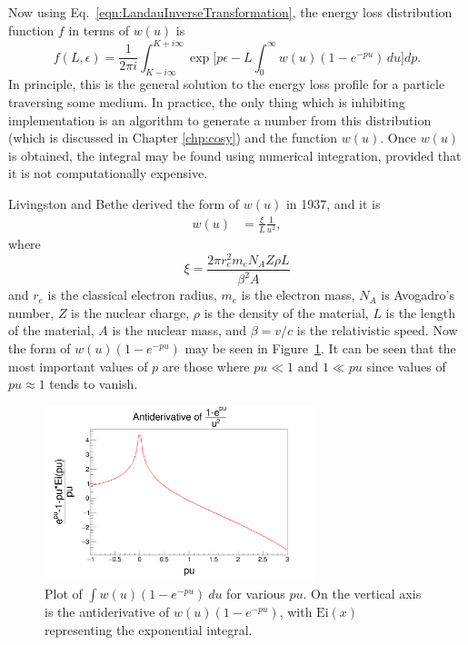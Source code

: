Now using Eq.~\eqref{eqn:LandauInverseTransformation}, the energy loss distribution function $f$ in terms of $w(u)$ is 
\begin{equation} \label{eqn:LandauGeneralSolution}
f(L,\epsilon)=\frac{1}{2\pi i} \int_{K-i\infty} ^{K+i\infty} \exp\Big[p\epsilon-L\int_0 ^\infty w(u)  (1-e^{-pu})\, du\Big] dp.
\end{equation}
In principle, this is the general solution to the energy loss profile for a particle traversing some medium. In practice, the only thing which is inhibiting implementation is an algorithm to generate a number from this distribution (which is discussed in Chapter \ref{chp:cosy}) and the function $w(u)$. Once $w(u)$ is obtained, the integral may be found using numerical integration, provided that it is not computationally expensive.

Livingston and Bethe \cite{livingston} derived the form of $w(u)$ in 1937, and it is
\begin{align*}
w(u)&=\frac{\xi}{L}\frac{1}{u^2},
\end{align*}
where
\begin{equation}\label{eqn:xi}
\xi=\frac{2\pi r_e ^2 m_e N_A Z\rho L}{\beta^2 A}
\end{equation}
and $r_e$ is the classical electron radius, $m_e$ is the electron mass, $N_A$ is Avogadro's number, $Z$ is the nuclear charge, $\rho$ is the density of the material, $L$ is the length of the material, $A$ is the nuclear mass, and $\beta=v/c$ is the relativistic speed. Now the form of $w(u)(1-e^{-pu})$ may be seen in Figure~\ref{fig:landauPUPlot}. It can be seen that the most important values of $p$ are those where $pu \ll 1$ and $1 \ll pu$ since values of $pu\approx 1$ tends to vanish.

\begin{figure}[h!]
  \centering
    \includegraphics[width=0.7\textwidth]{Figures/landauPUPlot} 
  \caption[Plot of $\int w(u)(1-e^{-pu})\ du$.]{Plot of $\int w(u)(1-e^{-pu})\ du$ for various $pu$. On the vertical axis is the antiderivative of $w(u)(1-e^{-pu})$, with $\text{Ei}(x)$ representing the exponential integral.}
  \label{fig:landauPUPlot}
\end{figure}

